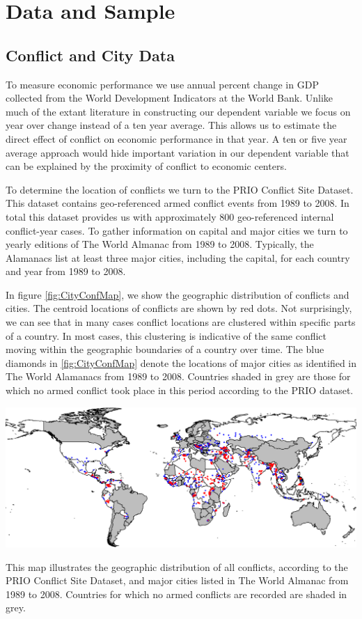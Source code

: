 \section{Data and Sample}
\label{empirics}

\subsection{Conflict and City Data}

To measure economic performance we use annual percent change in GDP collected from the World Development Indicators at the World Bank. Unlike much of the extant literature in constructing our dependent variable we focus on year over change instead of a ten year average. This allows us to estimate the direct effect of conflict on economic performance in that year. A ten or five year average approach would hide important variation in our dependent variable that can be explained by the proximity of conflict to economic centers.

To determine the location of conflicts we turn to the PRIO Conflict Site Dataset. This dataset contains geo-referenced armed conflict events from 1989 to 2008. In total this dataset provides us with approximately 800 geo-referenced internal conflict-year cases. To gather information on capital and major cities we turn to yearly editions of The World Almanac from 1989 to 2008. Typically, the Alamanacs list at least three major cities, including the capital, for each country and year from 1989 to 2008. 

In figure \ref{fig:CityConfMap}, we show the geographic distribution of conflicts and cities. The centroid locations of conflicts are shown by red dots. Not surprisingly, we can see that in many cases conflict locations are clustered within specific parts of a country. In most cases, this clustering is indicative of the same conflict moving within the geographic boundaries of a country over time. The blue diamonds in \ref{fig:CityConfMap} denote the locations of major cities as identified in The World Alamanacs from 1989 to 2008. Countries shaded in grey are those for which no armed conflict took place in this period according to the PRIO dataset.  

\begin{amssidewaysfigure}
	\centering
	\includegraphics[width=1\textwidth]{CityConfMap-crop}
	\caption{This map illustrates the geographic distribution of all conflicts, according to the PRIO Conflict Site Dataset, and major cities listed in The World Almanac from 1989 to 2008. Countries for which no armed conflicts are recorded are shaded in grey.}
	\label{fig:CityConfMap}
\end{amssidewaysfigure}
\FloatBarrier

